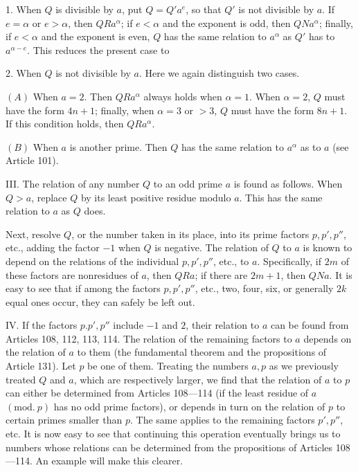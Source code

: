 1. When $Q$ is divisible by $a$, put $Q=Q'a^e$, so that $Q'$ is not divisible by $a$. If $e=\alpha$ or $e>\alpha$, then $QRa^{\alpha}$; if $e<\alpha$ and the exponent is odd, then $QNa^{\alpha}$; finally, if $e<\alpha$ and the exponent is even, $Q$ has the same relation to $a^{\alpha}$ as $Q'$ has to $a^{\alpha-e}$. This reduces the present case to

2. When $Q$ is not divisible by $a$. Here we again distinguish two cases.

$(A)$ When $a=2$. Then $QRa^{\alpha}$ always holds when $\alpha=1$. When $\alpha=2$, $Q$ must have the form $4n+1$; finally, when $\alpha=3$ or $>3$, $Q$ must have the form $8n+1$. If this condition holds, then $QRa^{\alpha}$.

$(B)$ When $a$ is another prime. Then $Q$ has the same relation to $a^{\alpha}$ as to $a$ (see Article 101).

III. The relation of any number $Q$ to an odd prime $a$ is found as follows. When $Q>a$, replace $Q$ by its least positive residue modulo $a$. This has the same relation to $a$ as $Q$ does.

Next, resolve $Q$, or the number taken in its place, into its prime factors $p,p',p''$, etc., adding the factor $-1$ when $Q$ is negative. The relation of $Q$ to $a$ is known to depend on the relations of the individual $p,p',p''$, etc., to $a$. Specifically, if $2m$ of these factors are nonresidues of $a$, then $QRa$; if there are $2m+1$, then $QNa$. It is easy to see that if among the factors $p,p',p''$, etc., two, four, six, or generally $2k$ equal ones occur, they can safely be left out.

IV. If the factors $p.p',p''$ include $-1$ and $2$, their relation to $a$ can be found from Articles 108, 112, 113, 114. The relation of the remaining factors to $a$ depends on the relation of $a$ to them (the fundamental theorem and the propositions of Article 131). Let $p$ be one of them. Treating the numbers $a,p$ as we previously treated $Q$ and $a$, which are respectively larger, we find that the relation of $a$ to $p$ can either be determined from Articles 108---114 (if the least residue of $a$ $(\mathrm{mod.}\ p)$ has no odd prime factors), or depends in turn on the relation of $p$ to certain primes smaller than $p$. The same applies to the remaining factors $p',p''$, etc. It is now easy to see that continuing this operation eventually brings us to numbers whose relations can be determined from the propositions of Articles 108---114. An example will make this clearer.


